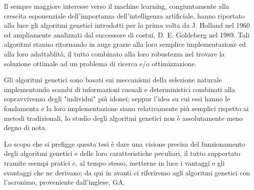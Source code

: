 
Il sempre maggiore interesse verso il machine learning, congiuntamente alla crescita esponenziale dell'importanza dell'intelligenza artificiale,  hanno riportato alla luce gli algoritmi genetici introdotti per la prima volta da J. Holland nel 1960 ed ampliamente analizzati dal successore di costui, D. E. Goldeberg \cite{goldberg1} nel 1989. Tali algoritmi stanno ritornando in auge grazie alla loro semplice implementazione ed alla loro adattablit\`a, il tutto combinato alla loro robustezza nel trovare la soluzione ottimale ad un problema di ricerca e/o ottimizzazione.

Gli algoritmi genetici sono basati sui meccanismi della selezione naturale implementando scambi di informazioni casuali e deterministici combinati alla sopravvivenza degli "individui" pi\`u idonei; seppur l'idea su cui essi hanno le fondamenta e la loro implementazione siano relativamente pi\`u semplici rispetto ai metodi tradizionali, lo studio degli algoritmi genetici non \`e assolutamente meno degno di nota.
\vspace{3mm}

Lo scopo che si prefigge questa tesi \`e dare una visione precisa del funzionamento degli algoritmi genetici e delle loro caratteristiche peculiari, il tutto supportato tramite esempi pratici e, al tempo stesso, metterne in luce i vantaggi e gli svantaggi che ne derivano; da qui in avanti ci riferiremo agli algoritmi genetici con l'acronimo, proveniente dall'inglese, GA.

